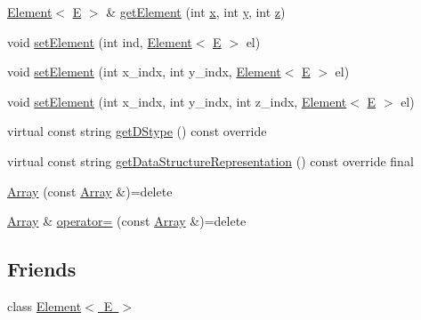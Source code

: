 \begin{DoxyCompactItemize}
\item 
\mbox{\hyperlink{classbridges_1_1_element}{Element}}$<$ \mbox{\hyperlink{namespacebridges_acfb0a4f7877d8f63de3e6862004c50eda3a3ea00cfc35332cedf6e5e9a32e94da}{E}} $>$ \& \mbox{\hyperlink{classbridges_1_1_array_a7006eeac547c391cb7e8eb19c56ae9f6}{get\+Element}} (int \mbox{\hyperlink{namespacebridges_acfb0a4f7877d8f63de3e6862004c50eda9dd4e461268c8034f5c8564e155c67a6}{x}}, int \mbox{\hyperlink{namespacebridges_acfb0a4f7877d8f63de3e6862004c50eda415290769594460e2e485922904f345d}{y}}, int \mbox{\hyperlink{namespacebridges_acfb0a4f7877d8f63de3e6862004c50edafbade9e36a3f36d3d676c1b808451dd7}{z}})
\item 
void \mbox{\hyperlink{classbridges_1_1_array_aa4609a029a5c988c0bb2908030fd9dc5}{set\+Element}} (int ind, \mbox{\hyperlink{classbridges_1_1_element}{Element}}$<$ \mbox{\hyperlink{namespacebridges_acfb0a4f7877d8f63de3e6862004c50eda3a3ea00cfc35332cedf6e5e9a32e94da}{E}} $>$ el)
\item 
void \mbox{\hyperlink{classbridges_1_1_array_a428cc76d22af71c5ae57dc293780b8ec}{set\+Element}} (int x\+\_\+indx, int y\+\_\+indx, \mbox{\hyperlink{classbridges_1_1_element}{Element}}$<$ \mbox{\hyperlink{namespacebridges_acfb0a4f7877d8f63de3e6862004c50eda3a3ea00cfc35332cedf6e5e9a32e94da}{E}} $>$ el)
\item 
void \mbox{\hyperlink{classbridges_1_1_array_a526c3a190b48a338541e5b4667c5eedf}{set\+Element}} (int x\+\_\+indx, int y\+\_\+indx, int z\+\_\+indx, \mbox{\hyperlink{classbridges_1_1_element}{Element}}$<$ \mbox{\hyperlink{namespacebridges_acfb0a4f7877d8f63de3e6862004c50eda3a3ea00cfc35332cedf6e5e9a32e94da}{E}} $>$ el)
\item 
virtual const string \mbox{\hyperlink{classbridges_1_1_array_ab93f7379870a7c0bc63490c53d95ba09}{get\+D\+Stype}} () const override
\item 
virtual const string \mbox{\hyperlink{classbridges_1_1_array_a12fe4db83918741620574b9c07fa62b0}{get\+Data\+Structure\+Representation}} () const override final
\item 
\mbox{\hyperlink{classbridges_1_1_array_a3229045173ac984ca452e613b1ce1fa3}{Array}} (const \mbox{\hyperlink{classbridges_1_1_array}{Array}} \&)=delete
\item 
\mbox{\hyperlink{classbridges_1_1_array}{Array}} \& \mbox{\hyperlink{classbridges_1_1_array_af8a8b4fc43f57020db39207c80403e6f}{operator=}} (const \mbox{\hyperlink{classbridges_1_1_array}{Array}} \&)=delete
\end{DoxyCompactItemize}
\subsection*{Friends}
\begin{DoxyCompactItemize}
\item 
class \mbox{\hyperlink{classbridges_1_1_array_a8c6ff2a8dd3e27346dd25f588a78828a}{Element$<$ E $>$}}
\end{DoxyCompactItemize}


